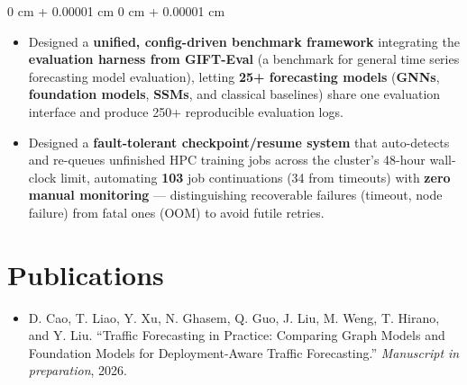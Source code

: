 \documentclass[10pt, letterpaper]{article}
\newenvironment{onecolentry}{
    \begin{adjustwidth}{
        0 cm + 0.00001 cm
    }{
        0 cm + 0.00001 cm
    }
}{
    \end{adjustwidth}
} %
\begin{document}
        \vspace{0.10 cm}
        \begin{onecolentry}
            \begin{itemize}
            
                \item Designed a \textbf{unified, config-driven benchmark framework} integrating the \textbf{evaluation harness from GIFT-Eval} (a benchmark for general time series forecasting model evaluation), letting \textbf{25+ forecasting models} (\textbf{GNNs}, \textbf{foundation models}, \textbf{SSMs}, and classical baselines) share one evaluation interface and produce 250+ reproducible evaluation logs.
                
                \item Designed a \textbf{fault-tolerant checkpoint/resume system} that auto-detects and re-queues unfinished HPC training jobs across the cluster's 48-hour wall-clock limit, automating \textbf{103} job continuations (34 from timeouts) with \textbf{zero manual monitoring} — distinguishing recoverable failures (timeout, node failure) from fatal ones (OOM) to avoid futile retries.


            \end{itemize}
        \end{onecolentry}
   
    
\section*{Publications}
\begin{itemize}
\item D. Cao, T. Liao, Y. Xu, N. Ghasem, Q. Guo, J. Liu, M. Weng, T. Hirano, and Y. Liu.
  ``Traffic Forecasting in Practice: Comparing Graph Models and Foundation Models 
  for Deployment-Aware Traffic Forecasting.''
  \textit{Manuscript in preparation}, 2026.
\end{itemize}
   
\end{document}
